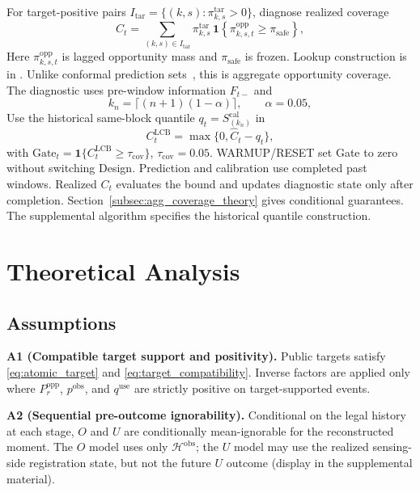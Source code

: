 \documentclass[letterpaper,journal]{IEEEtran}
\begin{document}
For target-positive pairs $I_{\mathrm{tar}}=\{(k,s):\pi^{\mathrm{tar}}_{k,s}>0\}$,
diagnose realized coverage
\begin{equation}
 C_t
 =
 \sum_{(k,s)\in I_{\mathrm{tar}}}
 \pi^{\mathrm{tar}}_{k,s}
 \,
 \mathbf{1}\!\left\{\pi^{\mathrm{opp}}_{k,s,t}\ge\pi_{\mathrm{safe}}\right\},
 \label{eq:agg_Ct}
\end{equation}
Here $\pi^{\mathrm{opp}}_{k,s,t}$ is lagged opportunity mass and
$\pi_{\mathrm{safe}}$ is frozen.  Lookup construction is in
.  Unlike conformal prediction
sets~\cite{lu2023federated,plassier2023conformal}, this is aggregate opportunity
coverage.  The diagnostic uses pre-window information $F_{t-}$ and
\begin{equation}
 k_n=\lceil(n+1)(1-\alpha)\rceil,
 \qquad
 \alpha=0.05,
 \label{eq:agg_kn}
\end{equation}
Use the historical same-block quantile $q_t=S^{\mathrm{cal}}_{(k_n)}$ in
\begin{equation}
 C^{\mathrm{LCB}}_t=\max\{0,\widehat C_t-q_t\},
 \label{eq:agg_CLCB}
\end{equation}
with $\mathrm{Gate}_t=\mathbf1\{C_t^{\mathrm{LCB}}\ge\tau_{\mathrm{cov}}\}$,
$\tau_{\mathrm{cov}}=0.05$.  WARMUP/RESET set Gate to zero without switching
Design.  Prediction and calibration use completed past windows.  Realized $C_t$
evaluates the bound and updates diagnostic state only after completion.
Section~\ref{subsec:agg_coverage_theory} gives conditional guarantees.  The
supplemental algorithm specifies the historical quantile construction.

\section{Theoretical Analysis}
\label{sec:theory}

\subsection{Assumptions}
\label{subsec:assumptions}

\noindent\textbf{A1 (Compatible target support and positivity).}
Public targets satisfy \eqref{eq:atomic_target} and
\eqref{eq:target_compatibility}.  Inverse factors are applied only where
$P_r^{\mathrm{opp}}$, $p^{\mathrm{obs}}$, and $q^{\mathrm{use}}$ are
strictly positive on target-supported events.

\noindent\textbf{A2 (Sequential pre-outcome ignorability).}
Conditional on the legal history at each stage, $O$ and $U$ are
conditionally mean-ignorable for the reconstructed moment.  The $O$ model
uses only $\mathcal{H}^{\mathrm{obs}}$; the $U$ model may use the realized
sensing-side registration state, but not the future $U$ outcome
(display in the supplemental material).
\end{document}
